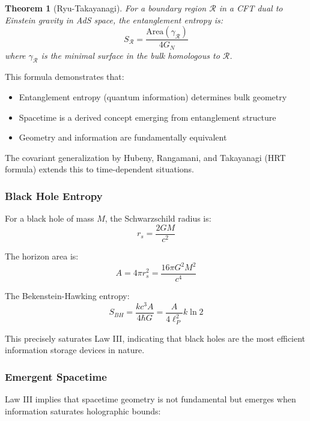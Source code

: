 \documentclass[11pt,a4paper]{article}
\theoremstyle{plain}
\newtheorem{theorem}{Theorem}[section]
\theoremstyle{definition}
\theoremstyle{remark}
\begin{document}
\begin{theorem}[Ryu-Takayanagi]
For a boundary region $\mathcal{R}$ in a CFT dual to Einstein gravity in AdS space, the entanglement entropy is:
\begin{equation}
S_{\mathcal{R}} = \frac{\text{Area}(\gamma_{\mathcal{R}})}{4G_N}
\end{equation}
where $\gamma_{\mathcal{R}}$ is the minimal surface in the bulk homologous to $\mathcal{R}$.
\end{theorem}

This formula demonstrates that:
\begin{itemize}[leftmargin=*]
\item Entanglement entropy (quantum information) determines bulk geometry
\item Spacetime is a derived concept emerging from entanglement structure
\item Geometry and information are fundamentally equivalent
\end{itemize}

The covariant generalization by Hubeny, Rangamani, and Takayanagi (HRT formula) extends this to time-dependent situations.

\subsubsection{Black Hole Entropy}

For a black hole of mass $M$, the Schwarzschild radius is:
\begin{equation}
r_s = \frac{2GM}{c^2}
\end{equation}

The horizon area is:
\begin{equation}
A = 4\pi r_s^2 = \frac{16\pi G^2M^2}{c^4}
\end{equation}

The Bekenstein-Hawking entropy:
\begin{equation}
S_{BH} = \frac{kc^3 A}{4\hbar G} = \frac{A}{4\ell_P^2}k\ln 2
\end{equation}

This precisely saturates Law III, indicating that black holes are the most efficient information storage devices in nature.

\subsubsection{Emergent Spacetime}

Law III implies that spacetime geometry is not fundamental but emerges when information saturates holographic bounds:
\end{document}
